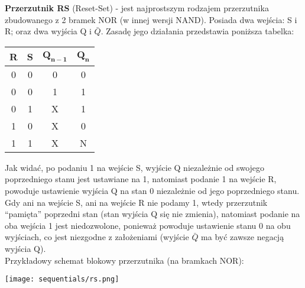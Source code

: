 \documentclass[main.tex]{subfiles}
\begin{document}
    \begin{definition}
        \textbf{Przerzutnik RS} (Reset-Set) - jest najprostszym rodzajem przerzutnika zbudowanego z 2 bramek NOR (w innej wersji NAND). Posiada dwa wejścia: S i R; oraz dwa wyjścia Q i $\bar{Q}$.
        Zasadę jego działania przedstawia poniższa tabelka:
        \begin{table}[H]
            \center
            \begin{tabular}{|c|c|c|c|}
                \hline
                \textbf{R} & \textbf{S} & $\mathbf{Q_{n-1}}$ & $\mathbf{Q_n}$ \\ \hline
                0 & 0 & 0 & 0              \\ \hline
                0 & 0 & 1 & 1              \\ \hline
                0 & 1 & X & 1              \\ \hline
                1 & 0 & X & 0              \\ \hline
                1 & 1 & X & N              \\ \hline
            \end{tabular}
        \end{table}
        Jak widać, po podaniu 1 na wejście S, wyjście Q niezależnie od swojego poprzedniego stanu jest ustawiane na 1, natomiast podanie 1 na wejście R, powoduje ustawienie wyjścia Q na stan 0 niezależnie od jego poprzedniego stanu. Gdy ani na wejście S, ani na wejście R nie podamy 1, wtedy przerzutnik ``pamięta'' poprzedni stan (stan wyjścia Q się nie zmienia), natomiast podanie na oba wejścia 1 jest niedozwolone, ponieważ powoduje ustawienie stanu 0 na obu wyjściach, co jest niezgodne z założeniami (wyjście $\bar{Q}$ ma być zawsze negacją wyjścia Q). \\
        \noindent Przykładowy schemat blokowy przerzutnika (na bramkach NOR): \\

        \begin{center}
            \texttt{[image: sequentials/rs.png]}
        \end{center}

    \end{definition}
\end{document}
